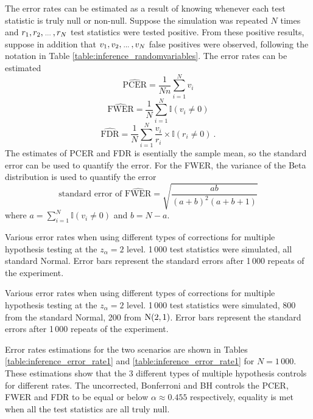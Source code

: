 The error rates can be estimated as a result of knowing whenever each test statistic is truly null or non-null. Suppose the simulation was repeated $N$ times and $r_1,r_2,\dotdotdot,r_N$ test statistics were tested positive. From these positive results, suppose in addition that $v_1,v_2,\dotdotdot,v_N$ false positives were observed, following the notation in Table \ref{table:inference_randomvariables}. The error rates can be estimated
\begin{equation}
	\widehat{\text{PCER}} = \frac{1}{Nn}\sum_{i=1}^N v_i
\end{equation}
\begin{equation}
	\widehat{\text{FWER}} = \frac{1}{N} \sum_{i=1}^N \mathbb{I}(v_i\neq 0)
\end{equation}
\begin{equation}
	\widehat{\text{FDR}} = \frac{1}{N}\sum_{i=1}^N\dfrac{v_i}{r_i}\times\mathbb{I}(r_i\neq0)
	\ .
\end{equation}
The estimates of PCER and FDR is esentially the sample mean, so the standard error can be used to quantify the error. For the FWER, the variance of the Beta distribution is used to quantify the error
\begin{equation}
	\text{standard error of }\widehat{\text{FWER}} = 
	\sqrt{\dfrac{ab}{(a+b)^2(a+b+1)}}
\end{equation}
where $a = \sum_{i=1}^N \mathbb{I}(v_i\neq 0)$ and $b = N - a$.

\begin{table}
    \centering
    
    \caption{Various error rates when using different types of corrections for multiple hypothesis testing at the $z_\alpha=2$ level. 1\,000 test statistics were simulated, all standard Normal. Error bars represent the standard errors after 1\,000 repeats of the experiment.}
    \label{table:inference_error_rate1}
\end{table}

\begin{table}
    \centering
    
    \caption{Various error rates when using different types of corrections for multiple hypothesis testing at the $z_\alpha=2$ level. 1\,000 test statistics were simulated, 800 from the standard Normal, 200 from $\operatorname{N}(2,1)$. Error bars represent the standard errors after 1\,000 repeats of the experiment.}
     \label{table:inference_error_rate1}
\end{table}

Error rates estimations for the two scenarios are shown in Tables \ref{table:inference_error_rate1} and \ref{table:inference_error_rate1} for $N=1\,000$. These estimations show that the 3 different types of multiple hypothesis controls for different rates. The uncorrected, Bonferroni and BH controls the PCER, FWER and FDR to be equal or below $\alpha\approx 0.455$ respectively, equality is met when all the test statistics are all truly null.


